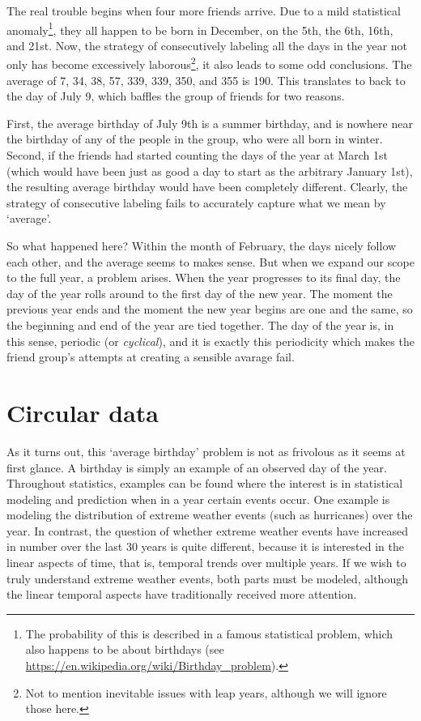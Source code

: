 \documentclass[12pt, a4paper]{book}\usepackage[]{graphicx}\usepackage[]{color}
\begin{document}
The real trouble begins when four more friends arrive. Due to a mild statistical anomaly\footnote{The probability of this is described in a famous statistical problem, which also happens to be about birthdays (see \url{https://en.wikipedia.org/wiki/Birthday_problem}).}, they all happen to be born in December, on the 5th, the 6th,  16th, and 21st. Now, the strategy of consecutively labeling all the days in the year not only has become excessively laborous\footnote{Not to mention inevitable issues with leap years, although we will ignore those here.}, it also leads to some odd conclusions. The average of 7, 34, 38, 57, 339, 339, 350, and 355 is 190. This translates to back to the day of July 9, which baffles the group of friends for two reasons.

First, the average birthday of July 9th is a summer birthday, and is nowhere near the birthday of any of the people in the group, who were all born in winter. Second, if the friends had started counting the days of the year at March 1st (which would have been just as good a day to start as the arbitrary January 1st), the resulting average birthday would have been completely different. Clearly, the strategy of consecutive labeling fails to accurately capture what we mean by `average'.

So what happened here? Within the month of February, the days nicely follow each other, and the average seems to makes sense. But when we expand our scope to the full year, a problem arises. When the year progresses to its final day, the day of the year rolls around to the first day of the new year. The moment the previous year ends and the moment the new year begins are one and the same, so the beginning and end of the year are tied together. The day of the year is, in this sense, periodic (or \textit{cyclical}), and it is exactly this periodicity which makes the friend group's attempts at creating a sensible avarage fail.

\section{Circular data}

As it turns out, this `average birthday' problem is not as frivolous as it seems at first glance. A birthday is simply an example of an observed day of the year. Throughout statistics, examples can be found where the interest is in statistical modeling and prediction when in a year certain events occur. One example is modeling the distribution of extreme weather events (such as hurricanes) over the year. In contrast, the question of whether extreme weather events have increased in number over the last 30 years is quite different, because it is interested in the linear aspects of time, that is, temporal trends over multiple years. If we wish to truly understand extreme weather events, both parts must be modeled, although the linear temporal aspects have traditionally received more attention.
\end{document}
